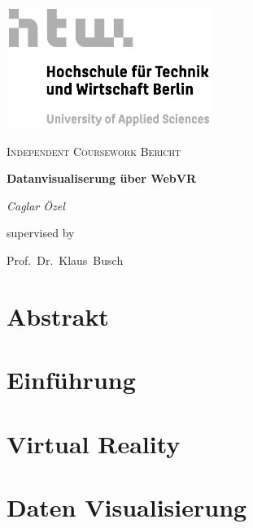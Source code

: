 \documentclass[a4paper, 11pt, oneside, onecolumn, final, openany]{report}
\begin{document}
    \begin{titlepage}
        \begin{center}
            \includegraphics[width=0.5\textwidth]{htw-logo.jpg}\par\vspace{1cm}
            \vspace{1cm}
            {\scshape\Large Independent Coursework Bericht\par}

            \vspace{1.5cm}
            {\Large\bfseries Datanvisualiserung über WebVR  }

            \vspace{2cm}
            {\Large\itshape Caglar Özel\par}

            \vfill

            supervised by\par
            Prof.\ Dr.\ Klaus\ Busch
            \vfill
        \end{center}
    \end{titlepage}

    \tableofcontents

    \newpage

    \chapter{Abstrakt}
    

    \chapter{Einführung}
    

    \chapter{Virtual Reality}
    
    
    \chapter{Daten Visualisierung}
    
\end{document}
